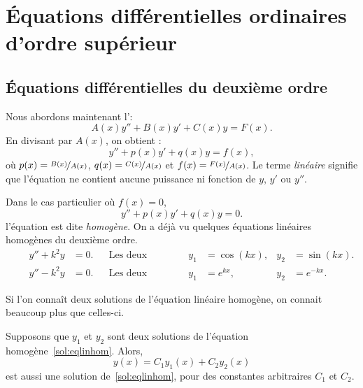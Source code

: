\chapter{Équations différentielles ordinaires d'ordre supérieur} \label{ho:chapter}


\section{Équations différentielles du deuxième ordre}
\label{solinear:section}


Nous abordons maintenant l'\emph{}:
\begin{equation*}
	A(x) y'' + B(x)y' + C(x)y = F(x) .
\end{equation*}
En divisant par $A(x)$, on obtient : 
\begin{equation} \label{sol:eqlin}
	y'' + p(x)y' + q(x)y = f(x) ,
\end{equation}
où $p(x) = \nicefrac{B(x)}{A(x)}$, $q(x) = \nicefrac{C(x)}{A(x)}$ 
et $f(x) = \nicefrac{F(x)}{A(x)}$.
Le terme \emph{linéaire} signifie que l'équation ne contient aucune puissance ni fonction de $y$, $y'$ ou $y''$.

Dans le cas particulier où $f(x) = 0$,
\begin{equation} \label{sol:eqlinhom}
	y'' + p(x)y' + q(x)y = 0 .
\end{equation}
l'équation est dite \emph{homogène}. 
On a déjà vu quelques équations linéaires homogènes du deuxième ordre.
\begin{align*}
	\qquad y'' + k^2 y & = 0. &
	& \text{Les deux solutions sont:} & y_1 &= \cos (kx), & y_2 &= \sin(kx) . \\
	\qquad y'' - k^2 y & = 0. &
	& \text{Les deux solutions sont:} &y_1 &= e^{kx}, & y_2 &= e^{-kx} . 
\end{align*}

Si l'on connaît deux solutions de l'équation linéaire homogène, on connait beaucoup plus que celles-ci.

\begin{theorem}[Superposition]
	Supposons que $y_1$ et $y_2$ sont deux solutions de l'équation homogène~\eqref{sol:eqlinhom}.  
	Alors,
	\begin{equation*}
		y(x) = C_1 y_1(x) + C_2 y_2(x) 
	\end{equation*}
	est aussi une solution de~\eqref{sol:eqlinhom}, pour des constantes arbitraires $C_1$ et $C_2$.
\end{theorem}

